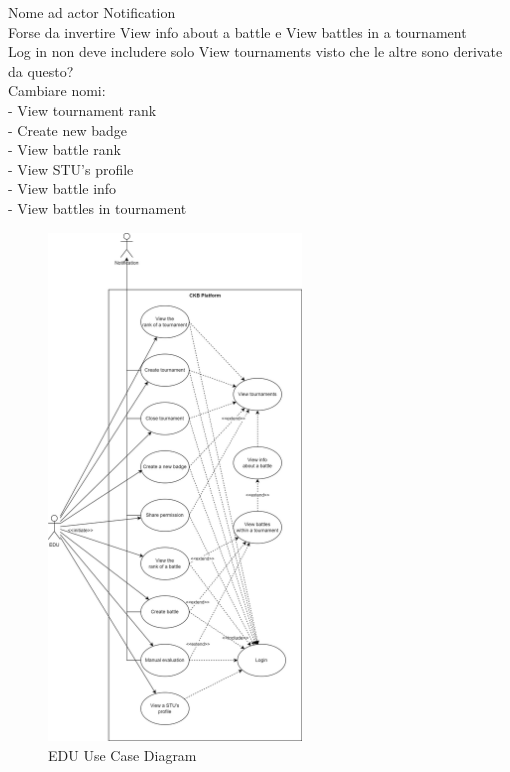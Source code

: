 {\color{red} 
        Nome ad actor Notification \\
        Forse da invertire View info about a battle e View battles in a tournament\\
        Log in non deve includere solo View tournaments visto che le altre sono derivate da questo?\\
        Cambiare nomi: \\
        - View tournament rank \\
        - Create new badge \\
        - View battle rank \\
        - View STU's profile \\
        - View battle info \\
        - View battles in tournament \\ 
}
\begin{figure}[H]
    \centering
    \includegraphics[width=0.6\textwidth]{images/sequence_diagrams/use_case_diagrams_EDU.png}
    \caption{EDU Use Case Diagram}
\end{figure}


